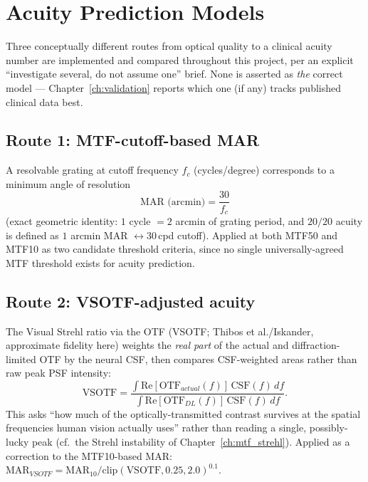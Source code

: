 \chapter{Acuity Prediction Models}
\label{ch:acuity_models}

Three conceptually different routes from optical quality to a clinical acuity number
are implemented and compared throughout this project, per an explicit ``investigate
several, do not assume one'' brief. None is asserted as \emph{the} correct model ---
Chapter~\ref{ch:validation} reports which one (if any) tracks published clinical data
best.

\section{Route 1: MTF-cutoff-based MAR}

A resolvable grating at cutoff frequency $f_c$ (cycles/degree) corresponds to a
minimum angle of resolution
\begin{equation}
\text{MAR (arcmin)} = \frac{30}{f_c}
\end{equation}
(exact geometric identity: $1$ cycle $=2$ arcmin of grating period, and $20/20$
acuity is defined as $1$ arcmin MAR $\leftrightarrow 30$\,cpd cutoff). Applied at both
MTF50 and MTF10 as two candidate threshold criteria, since no single universally-agreed
MTF threshold exists for acuity prediction.

\section{Route 2: VSOTF-adjusted acuity}

The Visual Strehl ratio via the OTF (VSOTF; Thibos et al./Iskander, approximate
fidelity here) weights the \emph{real part} of the actual and diffraction-limited OTF
by the neural CSF, then compares CSF-weighted areas rather than raw peak PSF
intensity:
\begin{equation}
\text{VSOTF} = \frac{\int \text{Re}[\text{OTF}_{actual}(f)]\,\text{CSF}(f)\,df}
{\int \text{Re}[\text{OTF}_{DL}(f)]\,\text{CSF}(f)\,df}.
\end{equation}
This asks ``how much of the optically-transmitted contrast survives at the spatial
frequencies human vision actually uses'' rather than reading a single, possibly-lucky
peak (cf.\ the Strehl instability of Chapter~\ref{ch:mtf_strehl}). Applied as a
correction to the MTF10-based MAR:
$\text{MAR}_{VSOTF} = \text{MAR}_{10}/\text{clip}(\text{VSOTF},0.25,2.0)^{0.1}$.

